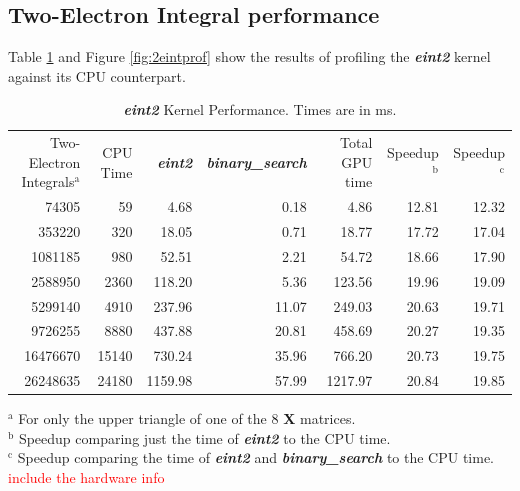 \documentclass[12pt]{report}
\newcommand{\notetodylan}[1]{\textcolor{red}{#1}} %
\newcommand{\kernel}[1]{\textit{\textbf{#1}}}
\begin{document}
\subsection{Two-Electron Integral performance}
Table \ref{tab:2eintprof} and Figure \ref{fig:2eintprof} show the results of profiling the \kernel{eint2} kernel against its CPU counterpart.

\begin{table}[h!]
\begin{center}
\caption[\kernel{eint2} Kernel Performance]{\kernel{eint2} Kernel Performance. Times are in ms.}
\label{tab:2eintprof}
\begin{tabular}{rrrrrrr}
\toprule
	\multirow{3}{2cm}{Two-Electron Integrals$^{\textrm{a}}$}	&	\multirow{3}{*}{CPU Time}		&	\multirow{3}{*}{\kernel{eint2}}	&	\multirow{3}{2.4cm}{\kernel{binary\_search}}		&	\multirow{3}{1cm}{Total GPU time}	&	\multirow{3}{*}{Speedup$^{\textrm{b}}$}	&	\multirow{3}{*}{Speedup$^{\textrm{c}}$}	\\
	\\
	\\
\midrule
	74305	&	59		&	4.68		&	0.18		&	4.86		&	12.81	&	12.32	\\
	353220	&	320		&	18.05	&	0.71		&	18.77	&	17.72	&	17.04	\\
	1081185	&	980		&	52.51	&	2.21		&	54.72	&	18.66	&	17.90	\\
	2588950	&	2360		&	118.20	&	5.36		&	123.56	&	19.96	&	19.09	\\
	5299140	&	4910		&	237.96	&	11.07	&	249.03	&	20.63	&	19.71	\\
	9726255	&	8880		&	437.88	&	20.81	&	458.69	&	20.27	&	19.35	\\
	16476670	&	15140	&	730.24	&	35.96	&	766.20	&	20.73	&	19.75	\\
	26248635	&	24180	&	1159.98	&	57.99	&	1217.97	&	20.84	&	19.85	\\
\bottomrule
\end{tabular}
\end{center}
$^{\textrm{a}}$ For only the upper triangle of one of the 8 \textbf{X} matrices. \\
$^{\textrm{b}}$ Speedup comparing just the time of \kernel{eint2} to the CPU time. \\
$^{\textrm{c}}$ Speedup comparing the time of \kernel{eint2} and \kernel{binary\_search} to the CPU time. \\
\notetodylan{include the hardware info}
\end{table}
\end{document}
